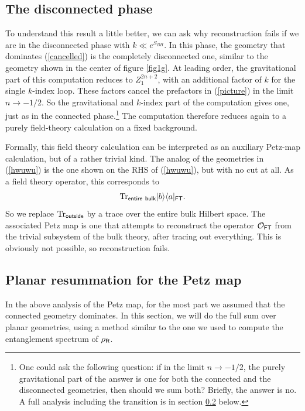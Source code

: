 \documentclass[12pt]{article}
\newcommand{\be}{\begin{equation}}
\newcommand{\ee}{\end{equation}}
\numberwithin{equation}{section}
\def\tr{\text{Tr}}
\begin{document}
\subsection{The disconnected phase}
To understand this result a little better, we can ask why reconstruction fails if we are in the disconnected phase with $k \ll e^{S_{BH}}$. In this phase, the geometry that dominates (\ref{cancelled}) is the completely disconnected one, similar to the geometry shown in the center of figure \ref{fig1g}. At leading order, the gravitational part of this computation reduces to $Z_1^{2n+2}$, with an additional factor of $k$ for the single $k$-index loop. These factors cancel the prefactors in (\ref{picture}) in the limit $n\rightarrow -1/2$. So the gravitational and $k$-index part of the computation gives one, just as in the connected phase.\footnote{One could ask the following question: if in the limit $n\rightarrow -1/2$, the purely gravitational part of the answer is one for both the connected and the disconnected geometries, then should we sum both? Briefly, the answer is no. A full analysis including the transition is in section \ref{sec:nonperPetz} below.} The computation therefore reduces again to a purely field-theory calculation on a fixed background.

Formally, this field theory calculation can be interpreted as an auxiliary Petz-map calculation, but of a rather trivial kind. The analog of the geometries in (\ref{hwuwu}) is the one shown on the RHS of (\ref{hwuwu}), but with no cut at all. As a field theory operator, this corresponds to 
\be
\tr_{\sf{entire \ bulk}}|b\rangle\langle a|_{\sf{FT}}.
\ee
So we replace $\tr_{\sf{outside}}$ by a trace over the entire bulk Hilbert space. The associated Petz map is one that attempts to reconstruct the operator $\mathcal{O}_{\sf{FT}}$ from the trivial subsystem of the bulk theory, after tracing out everything. This is obviously not possible, so reconstruction fails.


\subsection{Planar resummation for the Petz map}\label{sec:nonperPetz}
In the above analysis of the Petz map, for the most part we assumed that the connected geometry dominates. In this section, we will do the full sum over planar geometries, using a method similar to the one we used to compute the entanglement spectrum of $\rho_{\sf{R}}$. 
\end{document}
